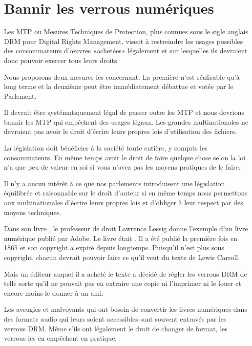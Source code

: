 \chapter{Bannir les verrous numériques}\label{verrous}

Les MTP ou Mesures Techniques de
Protection, plus
connues sous le sigle anglais DRM pour Digital
Rights Management, visent à restreindre les usages possibles des consommateurs d’œuvres «achetées»
légalement et sur lesquelles ils devraient donc pouvoir exercer tous leurs droits. 

Nous proposons deux mesures les concernant. La première n'est réalisable qu'à long terme et la deuxième peut être immédiatement débattue et votée par le Parlement.

\begin{mesure}
 Il devrait être systématiquement légal de passer outre les MTP et nous devrions bannir les MTP qui
empêchent des usages légaux. Les grandes multinationales ne devraient pas avoir le droit d’écrire
leurs propres lois d’utilisation des fichiers.
\end{mesure}

La législation doit bénéficier à la société toute entière, y compris les consommateurs. En même temps avoir le droit
de faire quelque chose selon la loi n’a que peu de valeur en soi si vous n’avez pas les moyens
pratiques de le faire.

Il n’y a aucun intérêt à ce que nos parlements introduisent une législation équilibrée et
raisonnable sur le droit d’auteur si en même temps nous permettons aux multinationales d’écrire
leurs propres lois et d’obliger à leur respect par des moyens techniques.

Dans son livre , le professeur de droit Lawrence Lessig donne l’exemple d’un livre
numérique publié par Adobe. Le livre était . Il a été publié la première
fois en 1865 et son copyright a expiré depuis longtemps. Puisqu’il n’est plus sous copyright,
chacun devrait pouvoir faire ce qu’il veut du texte de Lewis Carroll.

Mais un éditeur auquel il a acheté le texte a décidé de régler les verrous DRM de telle sorte qu'il ne pouvait pas en extraire une copie ni l’imprimer ni le louer et encore moins le donner à un ami.

Les aveugles et malvoyants qui ont besoin de convertir les livres numériques dans des formats audio
qui leurs soient accessibles sont souvent entravés par les verrous DRM. Même s’ils ont légalement le
droit de changer de format, les verrous les en empêchent en pratique.

